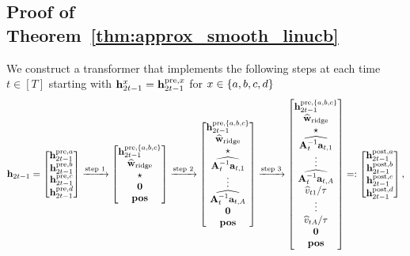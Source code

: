 \subsection{Proof of Theorem~\ref{thm:approx_smooth_linucb}}\label{sec:pf_thm:approx_smooth_linucb}
We construct a transformer that implements the following steps at each time $t\in[T]$ starting with ${\mathbf h}^{x}_{2t-1}={\mathbf h}^{{\mathrm{pre}},x}_{2t-1}$ for $x\in\{{a},{b},{c},{d}\}$ 
\begin{align}
    {\mathbf h}_{2t-1}=
    \begin{bmatrix}
    {\mathbf h}_{2t-1}^{{\mathrm{pre}},{a}} \\  {\mathbf h}_{2t-1}^{{\mathrm{pre}},{b}}\\  {\mathbf h}_{2t-1}^{{\mathrm{pre}},{c}}\\   {\mathbf h}_{2t-1}^{{\mathrm{pre}},{d}}
\end{bmatrix}
\xrightarrow{\text{step 1}}
   \begin{bmatrix}
    {\mathbf h}_{2t-1}^{{\mathrm{pre}},\{{a},{b},{c}\}} \\
        \widehat{{\mathbf w}}_{{\rm ridge}} \\ \star\\ {\mathbf 0} \\{\mathbf{pos}}
\end{bmatrix}
\xrightarrow{\text{step 2}}
\begin{bmatrix}
    {\mathbf h}_{2t-1}^{{\mathrm{pre}},\{{a},{b},{c}\}} \\
        \widehat{{\mathbf w}}_{{\rm ridge}} \\ \star\\ \widehat{{\mathbf A}_t^{-1}{\mathbf a}_{t,1}}\\\vdots\\\widehat{{\mathbf A}_t^{-1}{\mathbf a}_{t,A}}
        \\ {\mathbf 0} \\{\mathbf{pos}}
\end{bmatrix}
\xrightarrow{\text{step 3}}
\begin{bmatrix}
    {\mathbf h}_{2t-1}^{{\mathrm{pre}},\{{a},{b},{c}\}} \\
        \widehat{{\mathbf w}}_{{\rm ridge}} \\ \star\\ \widehat{{\mathbf A}_t^{-1}{\mathbf a}_{t,1}}\\\vdots\\\widehat{{\mathbf A}_t^{-1}{\mathbf a}_{t,A}}\\ {\widehat v_{t1}}/{{\tau}}\\\vdots\\ {\widehat v_{tA}}/{{\tau}}
        \\ {\mathbf 0} \\{\mathbf{pos}}
\end{bmatrix}
=:
\begin{bmatrix}
    {\mathbf h}_{2t-1}^{{\mathrm{post}},{a}} \\  {\mathbf h}_{2t-1}^{{\mathrm{post}},{b}}\\  {\mathbf h}_{2t-1}^{{\mathrm{post}},{c}}\\   {\mathbf h}_{2t-1}^{{\mathrm{post}},{d}}
\end{bmatrix},\label{eq:slinucb_pipeline}
\end{align}
